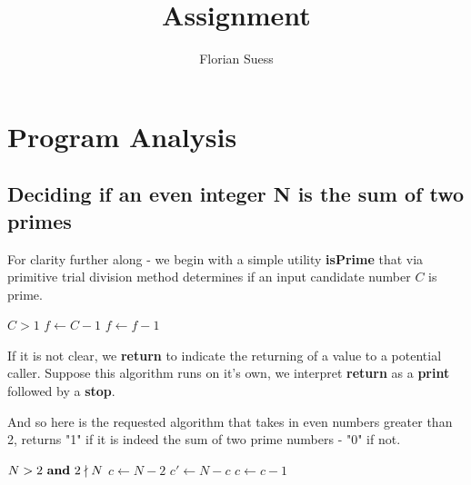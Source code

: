 \documentclass{article}
\title{Assignment}
\author{Florian Suess}
\begin{document}
\maketitle
\section{Program Analysis}
\subsection{Deciding if an even integer N is the sum of two primes}
For clarity further along - we begin with a simple utility \textbf{isPrime} that via primitive trial division method determines if an input candidate number $C$ is prime.

\vspace{1em}
\begin{algorithmic}[1]
	\REQUIRE $C > 1$
	\ENDIF
	\STATE $f \leftarrow C - 1$
		\ENDIF
		\STATE $f \leftarrow f - 1$
	\ENDWHILE
\end{algorithmic}
\vspace{1em}

If it is not clear, we \textbf{return} to indicate the returning of a value to a potential caller. Suppose this algorithm runs on it's own, we interpret \textbf{return} as a \textbf{print} followed by a \textbf{stop}.

\pagebreak

And so here is the requested algorithm that takes in even numbers greater than 2, returns "1" if it is indeed the sum of two prime numbers - "0" if not.

\vspace{1em}
\begin{algorithmic}[1]
	\REQUIRE $N > 2 \text{ \textbf{and} } 2 \nmid N$
	\STATE $c \leftarrow N - 2$
			\STATE $c' \leftarrow N - c$
			\ENDIF
		\ENDIF
		\STATE $c \leftarrow c - 1$
	\ENDWHILE
\end{algorithmic}
\vspace{1em}
\end{document}

